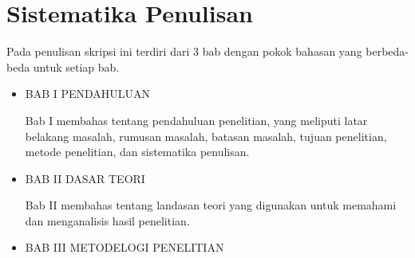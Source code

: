 \section{Sistematika Penulisan}
Pada penulisan skripsi ini terdiri dari 3 bab dengan pokok bahasan yang berbeda-beda untuk setiap bab.
\begin{itemize}
    \item BAB I PENDAHULUAN

    Bab I membahas tentang pendahuluan penelitian, yang meliputi latar belakang masalah, rumusan masalah, batasan masalah, tujuan penelitian, metode penelitian, dan sistematika penulisan.
    
    \item BAB II DASAR TEORI

    Bab II membahas tentang landasan teori yang digunakan untuk memahami dan menganalisis hasil penelitian.
    
    \item BAB III METODELOGI PENELITIAN
\end{itemize}